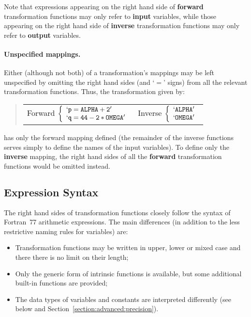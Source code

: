 \documentclass[twoside,nolof,11pt]{starlink}
\begin{document}
Note that expressions appearing on the right hand side of \textbf{forward}
transformation functions may only refer to \textbf{input} variables, while
those appearing on the right hand side of \textbf{inverse} transformation
functions may only refer to \textbf{output} variables.

\paragraph{Unspecified mappings.}
Either (although not both) of a transformation's mappings may be left
unspecified by omitting the right hand sides (and `$=$' signs) from all the
relevant transformation functions.
Thus, the transformation given by:

\begin{quote}
\begin{center}
\begin{tabular}{cc}

Forward $\left\{\begin{array}{l}
`\mathtt{p = ALPHA + 2}' \\
`\mathtt{q = 44 - 2 * OMEGA}'
\end{array}
\right.$
&
Inverse $\left\{\begin{array}{l}
`\mathtt{ALPHA}' \\
`\mathtt{OMEGA}'
\end{array}
\right.$

\end{tabular}
\end{center}
\end{quote}

has only the forward mapping defined (the remainder of the inverse functions
serves simply to define the names of the input variables).
To define only the \textbf{inverse} mapping, the right hand sides of all the
\textbf{forward} transformation functions would be omitted instead.


\subsection{Expression Syntax}

The right hand sides of transformation functions closely follow the syntax
of Fortran~77 arithmetic expressions.
The main differences (in addition to the less restrictive naming rules for
variables) are:

\begin{itemize}

\item Transformation functions may be written in upper, lower or mixed case
and there there is no limit on their length;

\item Only the generic form of intrinsic functions is available, but some
additional built-in functions are provided;

\item The data types of variables and constants are interpreted differently
(see below and Section~\ref{section:advanced:precision}).

\end{itemize}
\end{document}
